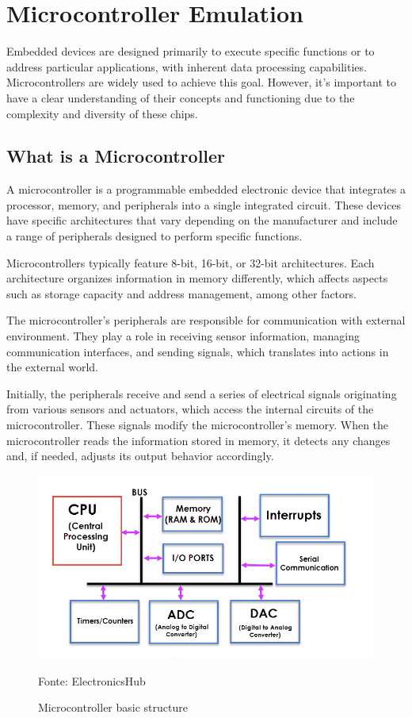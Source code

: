 \documentclass[../monografia.tex]{subfiles}
\begin{document}
\section{Microcontroller Emulation}

Embedded devices are designed primarily to execute specific functions or to address particular applications, with inherent data processing capabilities. Microcontrollers are widely used to achieve this goal. However, it’s important to have a clear understanding of their concepts and functioning due to the complexity and diversity of these chips.

\subsection{What is a Microcontroller}

A microcontroller is a programmable embedded electronic device that integrates a processor, memory, and peripherals into a single integrated circuit. These devices have specific architectures that vary depending on the manufacturer and include a range of peripherals designed to perform specific functions.

Microcontrollers typically feature 8-bit, 16-bit, or 32-bit architectures. Each architecture organizes information in memory differently, which affects aspects such as storage capacity and address management, among other factors.

The microcontroller's peripherals are responsible for communication with external environment. They play a role in receiving sensor information, managing communication interfaces, and sending signals, which translates into actions in the external world.

Initially, the peripherals receive and send a series of electrical signals originating from various sensors and actuators, which access the internal circuits of the microcontroller. These signals modify the microcontroller’s memory. When the microcontroller reads the information stored in memory, it detects any changes and, if needed, adjusts its output behavior accordingly.
\begin{figure}[h!]
\centering
    \caption{Microcontroller basic structure}
    \centering %
    \includegraphics[width=14cm]{microcontroller_structure.png}
    \par
    Fonte: ElectronicsHub \cite{eletronic_hub_23}
    \label{fig: Microcontroller basic structure}
\end{figure}
\end{document}
